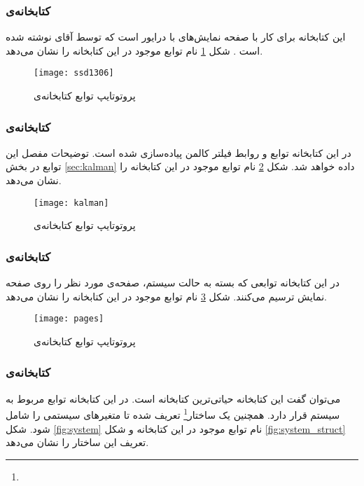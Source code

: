 \subsubsection{کتابخانه‌ی }
این کتابخانه برای کار با صفحه نمایش‌های با درایور  است که توسط آقای  نوشته شده است \cite{ssd1306}. شکل \ref{fig:ssd1306} نام توابع موجود در این کتابخانه را نشان می‌دهد.

\begin{figure}[h]
	\centering
	\texttt{[image: ssd1306]}
	\caption{پروتوتایپ توابع کتابخانه‌ی }
	\label{fig:ssd1306}
\end{figure}

\subsubsection{کتابخانه‌ی }
در این کتابخانه توابع و روابط فیلتر کالمن پیاده‌سازی شده است. توضیحات مفصل این توابع در بخش \ref{sec:kalman} داده خواهد شد. شکل \ref{fig:kalman} نام توابع موجود در این کتابخانه را نشان می‌دهد.

\begin{figure}[h]
	\centering
	\texttt{[image: kalman]}
	\caption{پروتوتایپ توابع کتابخانه‌ی }
	\label{fig:kalman}
\end{figure}

\subsubsection{کتابخانه‌ی }
در این کتابخانه توابعی که بسته به حالت سیستم، صفحه‌ی مورد نظر را روی صفحه نمایش ترسیم می‌کنند. شکل \ref{fig:pages} نام توابع موجود در این کتابخانه را نشان می‌دهد.

\begin{figure}[h]
	\centering
	\texttt{[image: pages]}
	\caption{پروتوتایپ توابع کتابخانه‌ی }
	\label{fig:pages}
\end{figure}

\subsubsection{کتابخانه‌ی }
می‌توان گفت این کتابخانه حیاتی‌ترین کتابخانه است. در این کتابخانه توابع مربوط به سیستم قرار دارد. همچنین یک ساختار\footnote{}
تعریف شده تا متغیرهای سیستمی را شامل شود. شکل \ref{fig:system} نام توابع موجود در این کتابخانه و شکل \ref{fig:system_struct} تعریف این ساختار را نشان می‌دهد.

